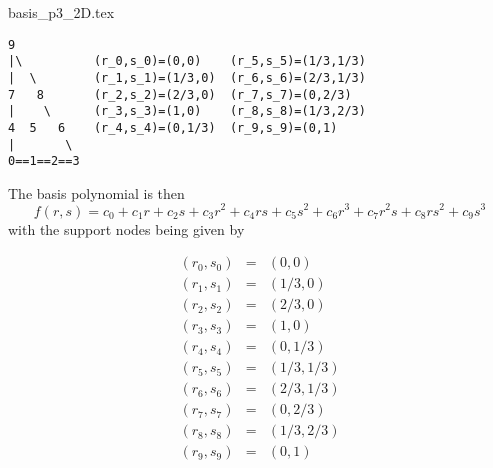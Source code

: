 \begin{flushright} {\tiny {\color{gray} basis\_p3\_2D.tex}} \end{flushright}

\begin{verbatim}
9
|\          (r_0,s_0)=(0,0)    (r_5,s_5)=(1/3,1/3)
|  \        (r_1,s_1)=(1/3,0)  (r_6,s_6)=(2/3,1/3)
7   8       (r_2,s_2)=(2/3,0)  (r_7,s_7)=(0,2/3)
|    \      (r_3,s_3)=(1,0)    (r_8,s_8)=(1/3,2/3)
4  5   6    (r_4,s_4)=(0,1/3)  (r_9,s_9)=(0,1)
|       \ 
0==1==2==3
\end{verbatim}
The basis polynomial is then
\[
f(r,s) = c_0 + c_1 r+ c_2 s + c_3r^2 + c_4 rs + c_5 s^2
+c_6 r^3 + c_7 r^2s + c_8 rs^2 + c_9 s^3
\]
with the support nodes being given by 

\begin{eqnarray}
(r_0,s_0) &=& (0,0) \\
(r_1,s_1) &=& (1/3,0) \\
(r_2,s_2) &=& (2/3,0) \\
(r_3,s_3) &=& (1,0) \\
(r_4,s_4) &=& (0,1/3) \\
(r_5,s_5) &=& (1/3,1/3) \\
(r_6,s_6) &=& (2/3,1/3) \\
(r_7,s_7) &=& (0,2/3) \\
(r_8,s_8) &=& (1/3,2/3) \\
(r_9,s_9) &=& (0,1) 
\end{eqnarray}


